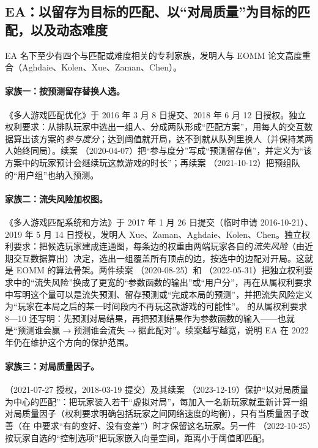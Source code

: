 \subsection{EA：以留存为目标的匹配、以“对局质量”为目标的匹配，以及动态难度}

EA 名下至少有四个与匹配或难度相关的专利家族，发明人与 EOMM 论文\cite{chen2017eomm}高度重合（Aghdaie、Kolen、Xue、Zaman、Chen）。

\paragraph{家族一：按预测留存替换人选。}
《多人游戏匹配优化》于 2016 年 3 月 8 日提交、2018 年 6 月 12 日授权\cite{aghdaie2018multiplayer}\tagPat。独立权利要求：从排队玩家中选出一组人、分成两队形成“匹配方案”，用每人的交互数据算出该方案的\emph{参与度分}；达到阈值就开局，达不到就从队列里换人（并保持某两人始终同局）\tagPat。续案 （2020-04-07）把“参与度分”写成“预测留存值”，并定义为“该方案中的玩家预计会继续玩这款游戏的时长”\cite{aghdaie2020multiplayer}\tagPat；再续案 （2021-10-12）把预组队的“用户组”也纳入预测\cite{aghdaie2021multiplayer}\tagPat。

\paragraph{家族二：流失风险加权图。}
《多人游戏匹配系统和方法》于 2017 年 1 月 26 日提交（临时申请 2016-10-21）、2019 年 5 月 14 日授权，发明人 Xue、Zaman、Aghdaie、Kolen、Chen\cite{xue2019multiplayer}\tagPat。独立权利要求：把候选玩家建成连通图，每条边的权重由两端玩家各自的\emph{流失风险}（由近期交互数据算出）决定，选出一组覆盖所有顶点的边，按选中的边配对开局\tagPat。这就是 EOMM 的算法骨架。两件续案 （2020-08-25）和 （2022-05-31）把独立权利要求中的“流失风险”换成了更宽的“参数函数的输出”或“用户分”，再在从属权利要求中写明这个量可以是流失预测、留存预测或“完成本局的预测”，并把流失风险定义为“玩家在本局之后的某一时间段内不再玩这款游戏的可能性”\cite{xue2020multiplayer,xue2022multiplayer}\tagPat。 的从属权利要求 8—10 还写明：先预测对局结果，再把预测结果作为参数函数的输入\tagPat——也就是“预测谁会赢$\to$预测谁会流失$\to$据此配对”。续案越写越宽，说明 EA 在 2022 年仍在维护这个方向的保护范围。

\paragraph{家族三：对局质量因子。}
（2021-07-27 授权，2018-03-19 提交）及其续案 （2023-12-19）保护“以对局质量为中心的匹配”：把玩家装入若干“虚拟对局”，每加入一名新玩家就重新计算一组对局质量因子（权利要求明确包括玩家之间网络速度的均衡），只有当质量因子改善（在  中要求“有的变好、没有变差”）时才保留这名玩家\cite{karlsen2021game,karlsen2023game}\tagPat。另一件 （2022-10-25）按玩家自选的“控制选项”把玩家嵌入向量空间，距离小于阈值即匹配\cite{wu2022user}\tagPat。

